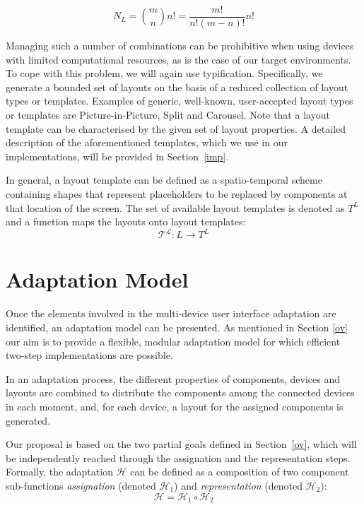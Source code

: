 \begin{equation} \label{combinatory2}
N_L = \binom{m}{n} n! = \frac{m!}{n!(m-n)!}n!
\end{equation}

Managing such a number of combinations can be prohibitive when using devices with limited computational resources, as is the case of our target environments. 
To cope with this problem, we will again use typification. 
Specifically, we generate a bounded set of layouts on the basis of a reduced collection of layout types or templates.
Examples of generic, well-known, user-accepted layout types or templates are Picture-in-Picture, Split  and Carousel. 
Note that a layout template can be characterised by the given set of layout properties.
A detailed description of the aforementioned templates, which we use in our implementations, will be provided in Section~\ref{imp}. 

In general, a layout template can be defined as a spatio-temporal scheme containing shapes that represent placeholders to be replaced by components at that location of the screen. 
The set of available layout templates is denoted as $T^L$ and a function maps the layouts onto layout templates:
\begin{equation}
\mathcal{T^L}:L \to T^L  
\end{equation}


\section{Adaptation Model}\label{ad}

Once the elements involved in the multi-device user interface adaptation are identified, an adaptation model can be presented. 
As mentioned in Section \ref{ov} our aim is to provide a flexible, modular adaptation model for which efficient two-step implementations are possible. 

In an adaptation process, the different properties of components, devices and layouts are combined to distribute the components among the connected devices in each moment, and, for each device, a layout for the assigned components is generated. 

Our proposal is based on the two partial goals defined in Section~\ref{ov}, which will be independently reached through the assignation and the representation steps.
Formally, the adaptation $\mathcal{H}$ can be defined as a composition of two component sub-functions \emph{assignation} (denoted $\mathcal{H}_1$) and \emph{representation} (denoted $\mathcal{H}_2$): 
\begin{equation}
\mathcal{H}=\mathcal{H}_1 \circ \mathcal{H}_2
\end{equation}

